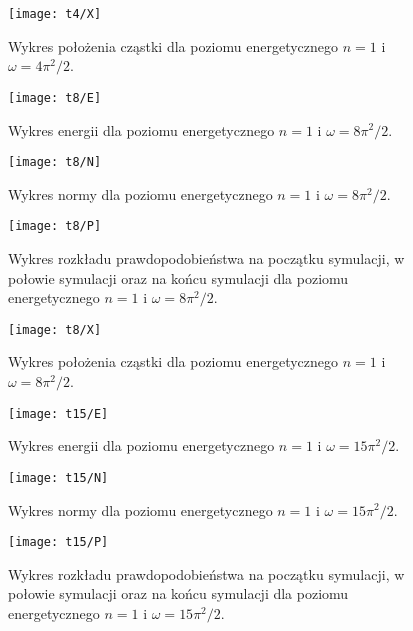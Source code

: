 \documentclass[a4paper,10pt]{article}
\begin{document}
	\begin{figure}[h]
	    \centering
	    \texttt{[image: t4/X]}
	    \caption{Wykres położenia cząstki dla poziomu energetycznego $n = 1$ i $\omega = 4\pi^2/2$.}
		\label{t4x}
	\end{figure}

	\begin{figure}[h]
	    \centering
	    \texttt{[image: t8/E]}
	    \caption{Wykres energii dla poziomu energetycznego $n = 1$ i $\omega = 8\pi^2/2$.}
		\label{t8e}
	\end{figure}		

	\begin{figure}[h]
	    \centering
	    \texttt{[image: t8/N]}
	    \caption{Wykres normy dla poziomu energetycznego $n = 1$ i $\omega = 8\pi^2/2$.}
		\label{t8n}
	\end{figure}

	\begin{figure}[h]
	    \centering
	    \texttt{[image: t8/P]}
	    \caption{Wykres rozkładu prawdopodobieństwa na początku symulacji, w połowie symulacji oraz na końcu symulacji dla poziomu energetycznego $n = 1$ i $\omega = 8\pi^2/2$.}
		\label{t8p}
	\end{figure}

	\begin{figure}[h]
	    \centering
	    \texttt{[image: t8/X]}
	    \caption{Wykres położenia cząstki dla poziomu energetycznego $n = 1$ i $\omega = 8\pi^2/2$.}
		\label{t8x}
	\end{figure}

	\begin{figure}[h]
	    \centering
	    \texttt{[image: t15/E]}
	    \caption{Wykres energii dla poziomu energetycznego $n = 1$ i $\omega = 15\pi^2/2$.}
		\label{t15e}
	\end{figure}		

	\begin{figure}[h]
	    \centering
	    \texttt{[image: t15/N]}
	    \caption{Wykres normy dla poziomu energetycznego $n = 1$ i $\omega = 15\pi^2/2$.}
		\label{t15n}
	\end{figure}

	\begin{figure}[h]
	    \centering
	    \texttt{[image: t15/P]}
	    \caption{Wykres rozkładu prawdopodobieństwa na początku symulacji, w połowie symulacji oraz na końcu symulacji dla poziomu energetycznego $n = 1$ i $\omega = 15\pi^2/2$.}
		\label{t15p}
	\end{figure}
\end{document}
